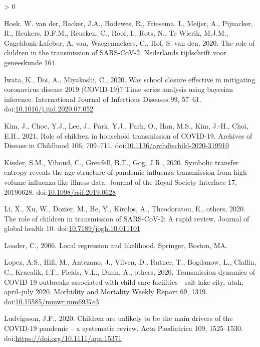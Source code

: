 \documentclass[]{elsarticle} %
\newlength{\cslhangindent}
\newenvironment{CSLReferences}[2] %
 {%
  \setlength{\parindent}{0pt}
  \ifodd #1 \everypar{\setlength{\hangindent}{\cslhangindent}}\ignorespaces\fi
  \ifnum #2 > 0
  \setlength{\parskip}{#2\baselineskip}
  \fi
 }%
 {}
\begin{document}
\begin{CSLReferences}{1}{0}
\leavevmode\hypertarget{ref-vanderhoek2020role}{}%
Hoek, W. van der, Backer, J.A., Bodewes, R., Friesema, I., Meijer, A., Pijnacker, R., Reukers, D.F.M., Reusken, C., Roof, I., Rots, N., Te Wierik, M.J.M., Gageldonk-Lafeber, A. van, Waegemaekers, C., Hof, S. van den, 2020. The role of children in the transmission of SARS-CoV-2. Nederlands tijdschrift voor geneeskunde 164.

\leavevmode\hypertarget{ref-iwata2020school}{}%
Iwata, K., Doi, A., Miyakoshi, C., 2020. Was school closure effective in mitigating coronavirus disease 2019 (COVID-19)? Time series analysis using bayesian inference. International Journal of Infectious Diseases 99, 57--61. doi:\href{https://doi.org/10.1016/j.ijid.2020.07.052}{10.1016/j.ijid.2020.07.052}

\leavevmode\hypertarget{ref-kim2021role}{}%
Kim, J., Choe, Y.J., Lee, J., Park, Y.J., Park, O., Han, M.S., Kim, J.-H., Choi, E.H., 2021. Role of children in household transmission of COVID-19. Archives of Disease in Childhood 106, 709--711. doi:\href{https://doi.org/10.1136/archdischild-2020-319910}{10.1136/archdischild-2020-319910}

\leavevmode\hypertarget{ref-kissler2020symbolic}{}%
Kissler, S.M., Viboud, C., Grenfell, B.T., Gog, J.R., 2020. Symbolic transfer entropy reveals the age structure of pandemic influenza transmission from high-volume influenza-like illness data. Journal of the Royal Society Interface 17, 20190628. doi:\href{https://doi.org/10.1098/rsif.2019.0628}{10.1098/rsif.2019.0628}

\leavevmode\hypertarget{ref-li2020role}{}%
Li, X., Xu, W., Dozier, M., He, Y., Kirolos, A., Theodoratou, E., others, 2020. The role of children in transmission of SARS-CoV-2: A rapid review. Journal of global health 10. doi:\href{https://doi.org/10.7189/jogh.10.011101}{10.7189/jogh.10.011101}

\leavevmode\hypertarget{ref-loader2006local}{}%
Loader, C., 2006. Local regression and likelihood. Springer, Boston, MA.

\leavevmode\hypertarget{ref-lopez2020transmission}{}%
Lopez, A.S., Hill, M., Antezano, J., Vilven, D., Rutner, T., Bogdanow, L., Claflin, C., Kracalik, I.T., Fields, V.L., Dunn, A., others, 2020. Transmission dynamics of COVID-19 outbreaks associated with child care facilities---salt lake city, utah, april--july 2020. Morbidity and Mortality Weekly Report 69, 1319. doi:\href{https://doi.org/10.15585/mmwr.mm6937e3}{10.15585/mmwr.mm6937e3}

\leavevmode\hypertarget{ref-ludvigsson2020children}{}%
Ludvigsson, J.F., 2020. Children are unlikely to be the main drivers of the COVID-19 pandemic -- a systematic review. Acta Paediatrica 109, 1525--1530. doi:\url{https://doi.org/10.1111/apa.15371}


\end{CSLReferences}
\end{document}
